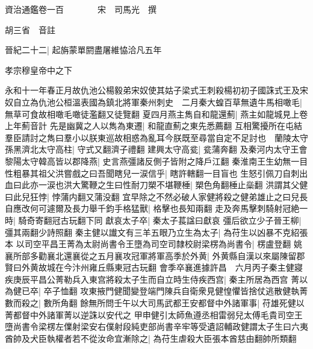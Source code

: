 






























































資治通鑑卷一百　　　　宋　司馬光　撰

胡三省　音註

晉紀二十二|{
	起旃蒙單閼盡屠維恊洽凡五年}


孝宗穆皇帝中之下

永和十一年春正月故仇池公楊毅弟宋奴使其姑子梁式王刺殺楊初初子國誅式王及宋奴自立為仇池公桓溫表國為鎮北將軍秦州刺史　二月秦大蝗百草無遺牛馬相噉毛|{
	無草可食故相噉毛噉徒濫翻又徒覽翻}
夏四月燕主雋自和龍還薊|{
	燕主如龍城見上卷上年薊音計}
先是幽冀之人以雋為東遷|{
	和龍直薊之東先悉薦翻}
互相驚擾所在屯結羣臣請討之雋曰羣小以朕東巡故相惑為亂耳今朕既至尋當自定不足討也　蘭陵太守孫黑濟北太守高柱|{
	守式又翻濟子禮翻}
建興太守高瓫|{
	瓫蒲奔翻}
及秦河内太守王會黎陽太守韓高皆以郡降燕|{
	史言燕彊諸反側子皆附之降戶江翻}
秦淮南王生幼無一目性粗暴其祖父洪嘗戲之曰吾聞瞎兒一涙信乎|{
	瞎許轄翻一目盲也}
生怒引佩刀自刺出血曰此亦一涙也洪大驚鞭之生曰性耐刀槊不堪鞭棰|{
	槊色角翻棰止橤翻}
洪謂其父健曰此兒狂悖|{
	悖蒲内翻又蒲没翻}
宜早除之不然必破人家健將殺之健弟雄止之曰兒長自應改何可遽爾及長力舉千鈞手格猛獸|{
	格擊也長知兩翻}
走及奔馬擊刺騎射冠絶一時|{
	騎奇寄翻冠古玩翻下同}
獻哀太子卒|{
	秦太子萇諡曰獻哀}
彊后欲立少子晉王柳|{
	彊其兩翻少詩照翻}
秦主健以䜟文有三羊五眼乃立生為太子|{
	為苻生以凶暴不克紹張本}
以司空平昌王菁為太尉尚書令王墮為司空司隸校尉梁楞為尚書令|{
	楞盧登翻}
姚襄所部多勸襄北還襄從之五月襄攻冠軍將軍高季於外黄|{
	外黄縣自漢以來屬陳留郡賢曰外黄故城在今汴州雍丘縣東冠古玩翻}
會季卒襄進據許昌　六月丙子秦主健寢疾庚辰平昌公菁勒兵入東宫將殺太子生而自立時生侍疾西宫|{
	秦主所居為西宫}
菁以為健已卒|{
	卒子恤翻}
攻東掖門健聞變登端門陳兵自衛衆見健惶懼皆捨仗逃散健執菁數而殺之|{
	數所角翻}
餘無所問壬午以大司馬武都王安都督中外諸軍事|{
	苻雄死健以菁都督中外諸軍菁以逆誅以安代之}
甲申健引太師魚遵丞相雷弱兒太傅毛貴司空王墮尚書令梁楞左㒒射梁安右僕射段純吏部尚書辛牢等受遺詔輔政健謂太子生曰六夷酋帥及犬臣執權者若不從汝命宜漸除之|{
	為苻生虐殺大臣張本酋慈由翻帥所類翻}


